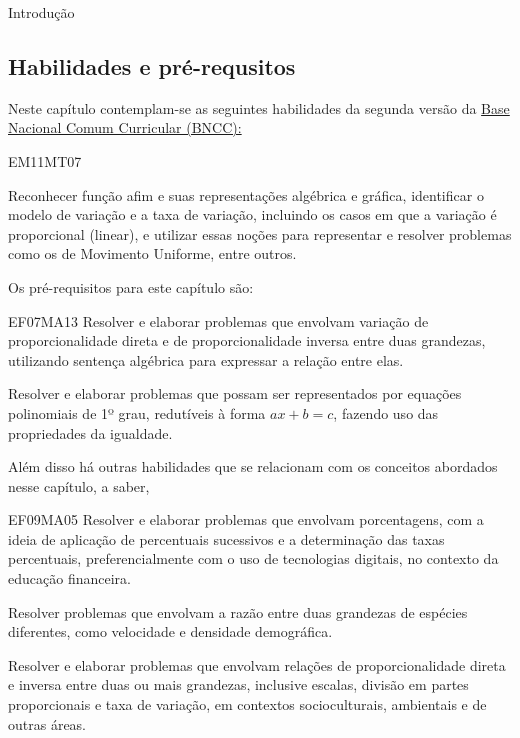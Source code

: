 \mainmatter

\begin{apresentacao}{Introdução}

\subsection{Habilidades e pré-requsitos}

Neste capítulo contemplam-se as seguintes habilidades da segunda versão da \href{http://historiadabncc.mec.gov.br/documentos/bncc-2versao.revista.pdf}{Base Nacional Comum Curricular (BNCC):}

\begin{habilities}{EM11MT07}

Reconhecer função afim e suas representações algébrica e gráfica, identificar o modelo de variação e a taxa de variação, incluindo os casos em que a variação é proporcional (linear), e utilizar essas noções para representar e resolver problemas como os de Movimento Uniforme, entre outros.
\end{habilities}

Os pré-requisitos para este capítulo são:

\begin{habilities}{EF07MA13} Resolver e elaborar problemas que envolvam variação de proporcionalidade direta e de proporcionalidade inversa entre duas grandezas, utilizando sentença algébrica para expressar a relação entre elas.

 Resolver e elaborar problemas que possam ser representados por equações polinomiais de 1º grau, redutíveis à forma \(ax+b=c\), fazendo uso das propriedades da igualdade.
\end{habilities}

Além disso há outras habilidades que se relacionam com os conceitos abordados nesse capítulo, a saber,

\begin{habilities}{EF09MA05} Resolver e elaborar problemas que envolvam porcentagens, com a ideia de aplicação de percentuais sucessivos e a determinação das taxas percentuais, preferencialmente com o uso de tecnologias digitais, no contexto da educação financeira.

 Resolver problemas que envolvam a razão entre duas grandezas de espécies diferentes, como velocidade e densidade demográfica.

 Resolver e elaborar problemas que envolvam relações de proporcionalidade direta e inversa entre duas ou mais grandezas, inclusive escalas, divisão em partes proporcionais e taxa de variação, em contextos socioculturais, ambientais e de outras áreas.


\end{habilities}
\end{apresentacao}
